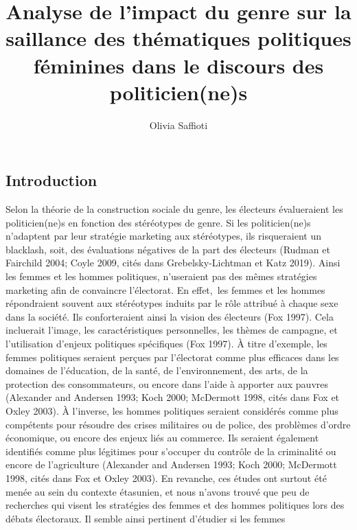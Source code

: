 \documentclass[
  letterpaper,
  DIV=11,
  numbers=noendperiod]{scrartcl}
\title{Analyse de l'impact du genre sur la saillance des thématiques
politiques féminines dans le discours des politicien(ne)s}
\author{Olivia Saffioti}
\date{}
\begin{document}
\maketitle
\ifdefined\Shaded\renewenvironment{Shaded}{\begin{tcolorbox}[borderline west={3pt}{0pt}{shadecolor}, sharp corners, boxrule=0pt, interior hidden, breakable, enhanced, frame hidden]}{\end{tcolorbox}}\fi

\hypertarget{introduction}{%
\subsection{Introduction}\label{introduction}}

Selon la théorie de la construction sociale du genre, les électeurs
évalueraient les politicien(ne)s en fonction des stéréotypes de genre.
Si les politicien(ne)s n'adaptent par leur stratégie marketing aux
stéréotypes, ils risqueraient un blacklash, soit, des évaluations
négatives de la part des électeurs (Rudman et Fairchild 2004; Coyle
2009, cités dans Grebelsky-Lichtman et Katz 2019). Ainsi les femmes et
les hommes politiques, n'useraient pas des mêmes stratégies marketing
afin de convaincre l'électorat. En effet,~les femmes et les hommes
répondraient souvent aux stéréotypes induits par le rôle attribué à
chaque sexe dans la société. Ils conforteraient ainsi la vision des
électeurs (Fox 1997). Cela incluerait l'image, les caractéristiques
personnelles, les thèmes de campagne, et l'utilisation d'enjeux
politiques spécifiques (Fox 1997). À titre d'exemple, les femmes
politiques seraient perçues par l'électorat comme plus efficaces dans
les domaines de l'éducation, de la santé, de l'environnement, des arts,
de la protection des consommateurs, ou encore dans l'aide à apporter aux
pauvres (Alexander and Andersen 1993; Koch 2000; McDermott 1998, cités
dans Fox et Oxley 2003). À l'inverse, les hommes politiques seraient
considérés comme plus compétents pour résoudre des crises militaires ou
de police, des problèmes d'ordre économique, ou encore des enjeux liés
au commerce. Ils seraient également identifiés comme plus légitimes pour
s'occuper du contrôle de la criminalité ou encore de l'agriculture
(Alexander and Andersen 1993; Koch 2000; McDermott 1998, cités dans Fox
et Oxley 2003). En revanche, ces études ont surtout été menée au sein du
contexte étasunien, et nous n'avons trouvé que peu de recherches qui
visent les stratégies des femmes et des hommes politiques lors des
débats électoraux. Il semble ainsi pertinent d'étudier si les femmes
\end{document}

